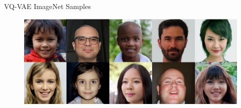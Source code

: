 \begin{frame}[allowframebreaks]{VQ-VAE ImageNet Samples}
\begin{figure}
        \centering
        \includegraphics[height=0.9\textheight, width=\textwidth, keepaspectratio]{images/vae/vqvae2_samples.PNG}
\end{figure}
\end{frame}